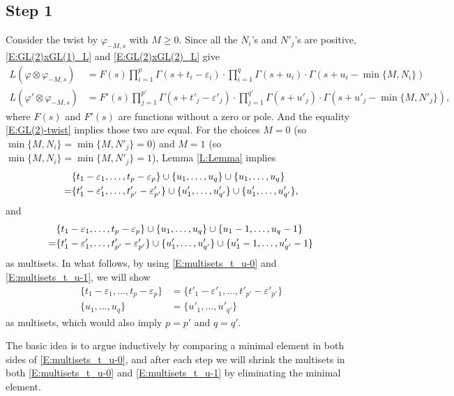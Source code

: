 \documentclass[11pt]{amsart}
\theoremstyle{plain}
\theoremstyle{definition}
\numberwithin{equation}{section}
\newcommand{\ep}{\varepsilon}
\begin{document}
\subsection{Step 1}
Consider the twist by $\varphi_{-M, s}$ with $M\geq 0$. Since
all the $N_i$'s and $N'_j$'s are positive, \eqref{E:GL(2)xGL(1)_L} and
\eqref{E:GL(2)xGL(2)_L} give
\begin{align*}
L(\varphi\otimes\varphi_{-M,  s})&=F(s)
\prod_{i=1}^{p}\Gamma(s+t_i-\ep_i)\cdot
\prod_{i=1}^{q}\Gamma(s+u_i)\cdot\Gamma(s+u_i-\min\{M, N_i\})\\
L(\varphi'\otimes\varphi_{-M,  s})&=F'(s)
\prod_{j=1}^{p'}\Gamma(s+t'_j-\ep'_j)\cdot
\prod_{j=1}^{q'}\Gamma(s+u'_j)\cdot\Gamma(s+u'_j-\min\{M, N'_j\}),
\end{align*}
where $F(s)$ and $F'(s)$ are functions without a zero or pole. And the
equality \eqref{E:GL(2)-twist} implies those two are equal. For the
choices $M=0$ (so $\min\{M, N_i\} =\min\{M, N'_j\}=0$) and $M=1$
(so $\min\{M, N_i\} =\min\{M, N'_j\}=1$), Lemma \ref{L:Lemma} implies
\begin{align}\label{E:multisets_t_u-0}
&\{t_1-\ep_1,\dots,t_p-\ep_p\}\cup\{u_1,\dots,u_q\}\cup\{u_1,\dots,u_q\}\\
\notag=&\{t'_1-\ep'_1,\dots,t'_{p'}-\ep'_{p'}\}\cup\{u'_1,\dots,u'_{q'}\}\cup\{u'_1,\dots,u'_{q'}\},
\end{align}
and
\begin{align}\label{E:multisets_t_u-1}
&\{t_1-\ep_1,\dots,t_p-\ep_p\}\cup\{u_1,\dots,u_q\}\cup\{u_1-1,\dots,u_q-1\}\\
\notag=&\{t'_1-\ep'_1,\dots,t'_{p'}-\ep'_{p'}\}\cup\{u'_1,\dots,u'_{q'}\}
\cup\{u'_1-1,\dots,u'_{q'}-1\}
\end{align}
as multisets. In what follows, by using \eqref{E:multisets_t_u-0} and \eqref{E:multisets_t_u-1}, we will show
\begin{align}\label{E:multisets_t-ep}
\{t_1-\ep_1,\dots,t_p-\ep_p\}&=\{t'_1-\ep'_1,\dots,t'_{p'}-\ep'_{p'}\}\\
\label{E:multisets_u}
\{u_1,\dots,u_q\}&=\{u'_1,\dots,u'_{q'}\}
\end{align}
as multisets, which would also imply $p=p'$ and $q=q'$.

The basic idea is to argue inductively by comparing a minimal element in both sides of
\eqref{E:multisets_t_u-0}, and after each step we will shrink the
multisets in both \eqref{E:multisets_t_u-0} and
\eqref{E:multisets_t_u-1} by eliminating the minimal element.
\end{document}
